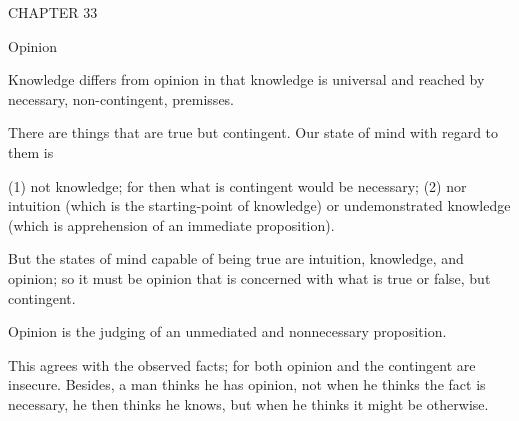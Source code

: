 {CHAPTER 33

Opinion

Knowledge differs from opinion in that knowledge is universal and
reached by necessary, non-contingent, premisses.

There are things that are true but contingent.
Our state of mind with regard to them is

(1) not knowledge;  for then what is contingent would be necessary;
(2) nor intuition (which is the starting-point of knowledge) or
undemonstrated knowledge (which is apprehension of an immediate proposition).

But the states of mind capable of being true are
intuition, knowledge, and opinion;
so it must be opinion that is concerned with
what is true or false, but contingent.

Opinion is the judging of an unmediated and nonnecessary proposition.

    This agrees with the observed facts;
    for both opinion and the contingent are insecure.
    Besides, a man thinks he has opinion, not when
    he thinks the fact is necessary, he then thinks he knows,
    but when he thinks it might be otherwise.

}
